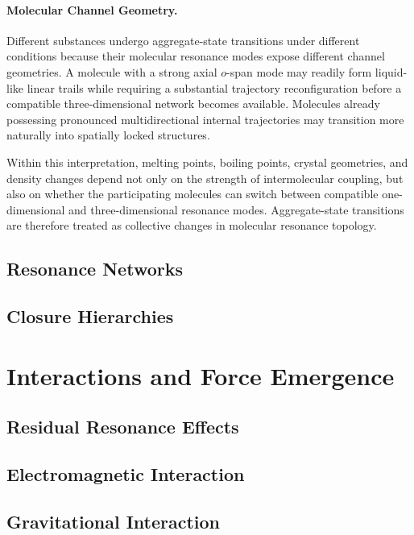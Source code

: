 \documentclass[11pt,a4paper]{article}
\begin{document}
\paragraph{Molecular Channel Geometry.}
Different substances undergo aggregate-state transitions under different conditions because their molecular resonance modes expose different channel geometries. A molecule with a strong axial \(o\)-span mode may readily form liquid-like linear trails while requiring a substantial trajectory reconfiguration before a compatible three-dimensional network becomes available. Molecules already possessing pronounced multidirectional internal trajectories may transition more naturally into spatially locked structures.

Within this interpretation, melting points, boiling points, crystal geometries, and density changes depend not only on the strength of intermolecular coupling, but also on whether the participating molecules can switch between compatible one-dimensional and three-dimensional resonance modes. Aggregate-state transitions are therefore treated as collective changes in molecular resonance topology.


\subsection{Resonance Networks}
\subsection{Closure Hierarchies}





\section{Interactions and Force Emergence}

\subsection{Residual Resonance Effects}
\subsection{Electromagnetic Interaction}
\subsection{Gravitational Interaction}
\end{document}
